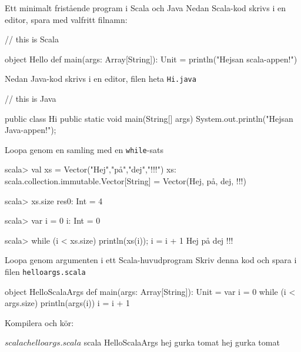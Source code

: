 
\begin{Slide}{Ett minimalt fristående program i Scala och Java}
Nedan Scala-kod skrivs i en editor, spara med valfritt filnamn:
\begin{Code}
// this is Scala

object Hello {
  def main(args: Array[String]): Unit = {
    println("Hejsan scala-appen!")
  }
}
\end{Code}

\pause
\vspace{1em}
Nedan Java-kod skrivs i en editor, filen  heta \texttt{Hi.java}

\begin{Code}[language=Java]
// this is Java

public class Hi {
    public static void main(String[] args) {
        System.out.println("Hejsan Java-appen!");
    }
}
\end{Code}

\end{Slide}


\begin{Slide}{Loopa genom en samling med en \texttt{while}-sats}
\begin{REPLnonum}
scala> val xs = Vector("Hej","på","dej","!!!")
xs: scala.collection.immutable.Vector[String] =
  Vector(Hej, på, dej, !!!)

scala> xs.size
res0: Int = 4

scala> var i = 0
i: Int = 0

scala> while (i < xs.size) { println(xs(i)); i = i + 1 }
Hej
på
dej
!!!
\end{REPLnonum}
\end{Slide}


\begin{Slide}{Loopa genom argumenten i ett Scala-huvudprogram}
Skriv denna kod och spara i filen \texttt{helloargs.scala}
\begin{Code}
object HelloScalaArgs {
  def main(args: Array[String]): Unit = {
    var i = 0
    while (i < args.size) {
      println(args(i))
      i = i + 1
    }
  }
}
\end{Code}
Kompilera och kör:
\begin{REPL}
$ scalac helloargs.scala
$ scala HelloScalaArgs hej gurka tomat
hej
gurka
tomat
\end{REPL}
\end{Slide}



